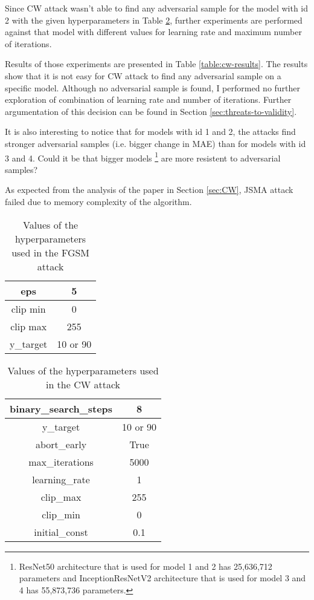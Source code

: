 Since CW attack wasn't able to find any adversarial sample for the model with id 2 with the given hyperparameters in Table \ref{table:cw-params}, further experiments are performed against that model with different values for learning rate and maximum number of iterations.

Results of those experiments are presented in Table \ref{table:cw-results}. The results show that it is not easy for CW attack to find any adversarial sample on a specific model. Although no adversarial sample is found, I performed no further exploration of combination of learning rate and number of iterations. Further argumentation of this decision can be found in Section \ref{sec:threats-to-validity}.

It is also interesting to notice that for models with id 1 and 2, the attacks find stronger adversarial samples (i.e. bigger change in MAE) than for models with id 3 and 4. Could it be that bigger models \footnote{ResNet50 architecture that is used for model 1 and 2 has 25,636,712 parameters and InceptionResNetV2  architecture that is used for model 3 and 4 has 55,873,736 parameters.} are more resistent to adversarial samples? 

As expected from the analysis of the paper \cite{DBLP:journals/corr/CarliniW16a} in Section \ref{sec:CW}, JSMA attack failed due to memory complexity of the algorithm.

\begin{table}[]
\centering
\begin{tabular}{|c|c|}
\hline
eps & 5 \\  \hline
clip min & 0  \\ \hline
clip max & 255 \\ \hline
y\_target & 10 or 90 \\ \hline
\end{tabular}
\caption{Values of the hyperparameters used in the FGSM attack}
\label{table:fgsm-params}
\end{table}

\begin{table}[]
\centering
\begin{tabular}{|c|c|}
\hline
binary\_search\_steps & 8 \\ \hline
y\_target & 10 or 90 \\ \hline
abort\_early & True \\ \hline
max\_iterations & 5000 \\ \hline
learning\_rate & 1 \\ \hline
clip\_max & 255 \\ \hline
clip\_min & 0 \\ \hline
initial\_const & 0.1 \\ \hline
\end{tabular}
\caption{Values of the hyperparameters  used in the CW attack}
\label{table:cw-params}
\end{table}


